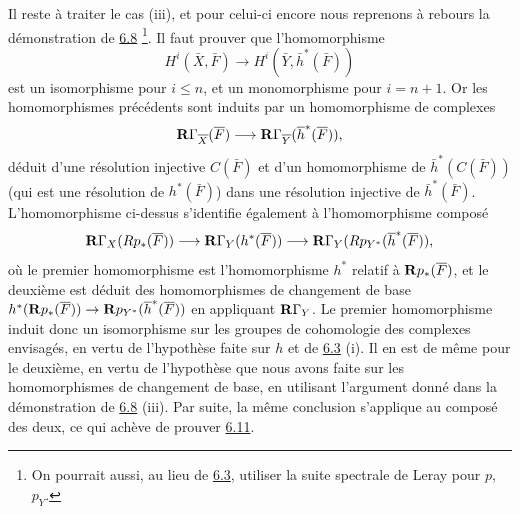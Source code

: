 \documentclass[10pt]{../fichiers-configuration-latex/smfart}
\begin{document}
Il reste à traiter le cas (iii), et pour celui-ci encore nous
reprenons à rebours la démonstration de \hyperref[XII.prop6.8]{6.8} \footnote[1]{On pourrait
aussi, au lieu de \hyperref[XII.cor6.3]{6.3}, utiliser la suite spectrale de Leray pour $p$,
$p_Y$.}. Il faut prouver que l'homomorphisme
$$
H^{i}(\bar{X},\bar{F})\longrightarrow
H^{i}(\bar{Y},\bar{h}^{\ast}(\bar{F}))
$$
est un isomorphisme pour $i\leq n$, et un monomorphisme pour
$i=n+1$. Or les homomorphismes précédents sont induits par un
homomorphisme de complexes
$$
\mathbf{R}\Gamma_{\overline{X}}(\overline{F})\longrightarrow
\mathbf{R}\Gamma_{\overline{Y}}(\overline{h}^{\ast}(\overline{F})){},
$$
déduit d'une résolution injective $C(\bar{F})$ et d'un homomorphisme
de $\bar{h}^{\ast}(C(\bar{F}))$ (qui est une résolution de
$h^{\ast}(\bar{F})$) dans une résolution injective de
$\bar{h}^{\ast}(\bar{F})$. L'homomorphisme ci-dessus s'identifie
également à l'homomorphisme composé
$$
\mathbf{R}\Gamma_X(Rp_{\ast}(\overline{F}))\longrightarrow
\mathbf{R}\Gamma_Y(h^{\ast}(\overline{F}))\longrightarrow
\mathbf{R}\Gamma_Y(Rp_{Y^{\ast}}(\overline{h}^{\ast}(\overline{F})){},
$$
où le premier homomorphisme est l'homomorphisme $h^{\ast}$ relatif à
$\mathbf{R} p_{\ast}(\overline{F})$, et le deuxième est déduit des
homomorphismes de changement de base
$h^{\ast}(\mathbf{R} p_{\ast}(\overline{F}))\rightarrow
\mathbf{R} p_{Y^{\ast}}(\overline{h}^{\ast}(\overline{F}))$ en appliquant
$\mathbf{R}\Gamma_Y$. Le premier homomorphisme induit donc un
isomorphisme sur les groupes de cohomologie des complexes envisagés,
en vertu de l'hypothèse faite sur $h$ et de \hyperref[XII.cor6.3]{6.3} (i). Il en est de même
pour le deuxième, en vertu de l'hypothèse que nous avons faite sur les
homomorphismes de changement de base, en utilisant l'argument donné
dans la démonstration de \hyperref[XII.prop6.8]{6.8} (iii). Par suite, la même conclusion
s'applique au composé des deux, ce qui achève de prouver \hyperref[XII.prop6.11]{6.11}.
\end{document}
